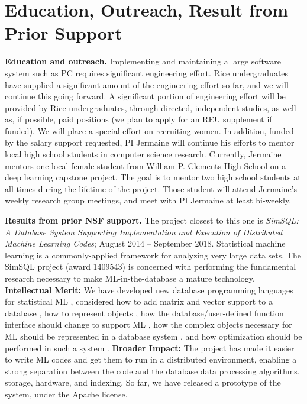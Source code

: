 
\section{Education, Outreach, Result from Prior Support}
 
\noindent
\textbf{Education and outreach.}
Implementing and maintaining a large software system such as PC requires significant engineering effort. 
Rice undergraduates have supplied a significant amount of the
engineering effort so far, and we will continue this going forward.
A significant portion of 
engineering effort will be provided by Rice undergraduates, through directed, independent studies, as well as, if possible, 
paid positions (we plan to apply for an REU supplement if funded).  
We will place a special effort on recruiting women.
In addition, funded by the salary support requested, PI Jermaine will continue his efforts to mentor local high school students in
computer science research.  
Currently, Jermaine mentors one local female student from William P. Clements High School on a deep learning capstone
project.  
The goal 
is to mentor two high school students at all times during the lifetime of the project.
Those student will attend Jermaine's weekly research group meetings, and meet with PI Jermaine at least bi-weekly.

\vspace{5 pt}
\noindent
\textbf{Results from prior NSF support.}
The project closest to this one is \textit{
SimSQL: A Database System Supporting Implementation and Execution of Distributed Machine Learning Codes}; 
August 2014 -- September 2018.
Statistical machine learning is a commonly-applied framework for analyzing very large data sets. The SimSQL project (award 1409543) is concerned with performing the fundamental research necessary to make ML-in-the-database a mature technology. \textbf{Intellectual Merit:} We have developed new database programming languages for statistical ML \cite{jermaineBUDS}, considered how to add matrix and vector support to a database \cite{jermaineVector}, how to represent objects \cite{jermaineComplex}, how the database/user-defined function interface should change to support ML \cite{jermaineUDF}, how the complex objects necessary for ML should be represented in a database system \cite{jermaineExperimental}, and how optimization should be performed in such a system \cite{rusu2015workload}. \textbf{Broader Impact:} The project has made it easier to write ML codes and get them to run in a distributed environment, enabling a strong separation between the code and the database data processing algorithms, storage, hardware, and indexing. So far, we have released a prototype of the system, under the Apache license.

